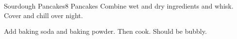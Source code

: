 \documentclass[../cookbook.tex]{subfiles}
\begin{document}
\begin{recipe}{Sourdough Pancakes}{8 Pancakes}{}
    Combine wet and dry ingredients and whisk. Cover and chill over night.

    Add baking soda and baking powder. Then cook. Should be bubbly.
\end{recipe}
\end{document}
